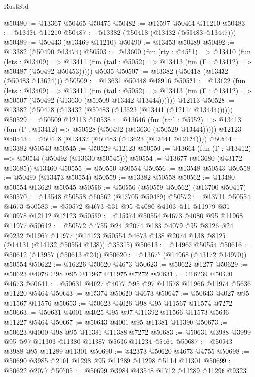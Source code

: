 \begin{lexlean}{RustStd}
\begin{coremodule}
@50480 := @13367 @50465 @50475
@50482 := @13597 @50464 @11210
@50483 := @13434 @11210
@50487 := @13382 (@50418 (@13432 (@50483 @13447)))
@50489 := @50443 (@13469 @11210)
@50490 := @13453 @50489
@50492 := @13382 (@50490 @13474)
@50503 := @13600
    (fun (rty : @4551) =>
    @13410
      (fun (lets : @13409) =>
      @13411 (fun (tail : @5052) => @13413 (fun (Γ : @13412) => @50487 (@50492 @50453)))))
    @5035
@50507 := @13382 (@50418 (@13432 (@50483 @13624)))
@50509 := @13631 @50448 @48916
@50521 := @13622
    (fun (lets : @13409) =>
    @13411
      (fun (tail : @5052) =>
      @13413 (fun (Γ : @13412) => @50507 (@50492 (@13630 (@50509 @13442 @13444))))))
    @12113
@50528 := @13382 (@50418 (@13432 (@50483 (@13623 (@13441 (@12114 @13444))))))
@50529 := @50509 @12113
@50538 := @13646
    (fun (tail : @5052) => @13413 (fun (Γ : @13412) => @50528 (@50492 (@13630 (@50529 @13444)))))
    @12123
@50543 := @50418 (@13432 (@50483 (@13623 (@13441 @12124))))
@50544 := @13382 @50543
@50545 := @50529 @12123
@50550 := @13664 (fun (Γ : @13412) => @50544 (@50492 (@13630 @50545)))
@50554 := @13677 (@13680 (@43172 @13685)) @13460
@50555 := @50550 @50554
@50556 := @13548 @50543
@50558 := @50490 (@13473 @50554)
@50559 := @13382 @50558
@50562 := @13480 @50554 @13629 @50545
@50566 := @50556 (@50559 @50562) (@13700 @50417)
@50570 := @13548 @50558 @50562 (@13705 @50489)
@50572 := @13711 @50554 @4673
@50583 := @50572 @4673 @31 @95 @4080 @4103 @11 @11979 @31 @10978 @12112 @12123
@50589 := @15374 @50554 @4673 @4080 @95 @11968 @11977
@50612 := @50572
    @4755
    @24
    @2074
    @183
    @4079
    @95
    @8126
    @24
    @9232
    @11967
    @11977
    (@14123 @50554 @4673 @138 @2074 @138 @8126 (@14131 (@14132 @50554 @138)) @35315)
@50613 := @14963 @50554
@50616 := @50612 (@13957 (@50613 @24))
@50620 := @13677 (@14968 (@43172 @14970)) @50554
@50622 := @16226 @50620 @4673
@50623 := @50622 @1277
@50629 := @50623 @4078 @98 @95 @11967 @11975 @7272
@50631 := @16239 @50620 @4673
@50641 := @50631 @4027 @4077 @95 @97 @11578 @11966 @11974 @5636 @11220 @5464
@50643 := @15374 @50620 @4673
@50647 := @50643 @4027 @95 @11567 @11576
@50653 := @50623 @4026 @98 @95 @11567 @11574 @7272
@50663 := @50631 @4001 @4025 @95 @97 @11392 @11566 @11573 @5636 @11227 @5464
@50667 := @50643 @4001 @95 @11381 @11390
@50673 := @50623 @4000 @98 @95 @11381 @11388 @7272
@50683 := @50631 @3988 @3999 @95 @97 @11303 @11380 @11387 @5636 @11234 @5464
@50687 := @50643 @3988 @95 @11289 @11301
@50690 := @42373 @50620 @4673 @4755
@50698 := @50690 @3985 @2101 @1298 @95 @11289 @11298 @5114 @11301
@50699 := @50622 @2077
@50705 := @50699 @3984 @43548 @1712 @11289 @11296 @9323

\end{coremodule}
\end{lexlean}
